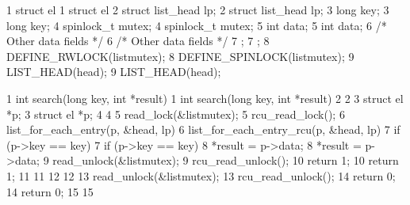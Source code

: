 \begin{listing*}
{ \scriptsize
\begin{verbbox}
 1 struct el {                           1 struct el {
 2   struct list_head lp;                2   struct list_head lp;
 3   long key;                           3   long key;
 4   spinlock_t mutex;                   4   spinlock_t mutex;
 5   int data;                           5   int data;
 6   /* Other data fields */             6   /* Other data fields */
 7 };                                    7 };
 8 DEFINE_RWLOCK(listmutex);             8 DEFINE_SPINLOCK(listmutex);
 9 LIST_HEAD(head);                      9 LIST_HEAD(head);
\end{verbbox}
}
\hspace*{0.9in}\OneColumnHSpace{-0.5in}
\IfEbookSize{\hspace*{-1.05in}}{}\theverbbox
\caption{将读写锁转换为RCU：
						    数据}
\label{lst:defer:Converting Reader-Writer Locking to RCU: Data}
\end{listing*}

\begin{listing*}
{ \scriptsize
\begin{verbbox}
 1 int search(long key, int *result)     1 int search(long key, int *result)
 2 {                                     2 {
 3   struct el *p;                       3   struct el *p;
 4                                       4
 5   read_lock(&listmutex);              5   rcu_read_lock();
 6   list_for_each_entry(p, &head, lp) { 6   list_for_each_entry_rcu(p, &head, lp) {
 7     if (p->key == key) {              7     if (p->key == key) {
 8       *result = p->data;              8       *result = p->data;
 9       read_unlock(&listmutex);        9       rcu_read_unlock();
10       return 1;                      10       return 1;
11     }                                11     }
12   }                                  12   }
13   read_unlock(&listmutex);           13   rcu_read_unlock();
14   return 0;                          14   return 0;
15 }                                    15 }
\end{verbbox}
}
\hspace*{0.9in}\OneColumnHSpace{-0.5in}
\IfEbookSize{\hspace*{-1.05in}}{}\theverbbox
\caption{将读写锁转换为RCU：
						    搜索}
\label{lst:defer:Converting Reader-Writer Locking to RCU: Search}
\end{listing*}

